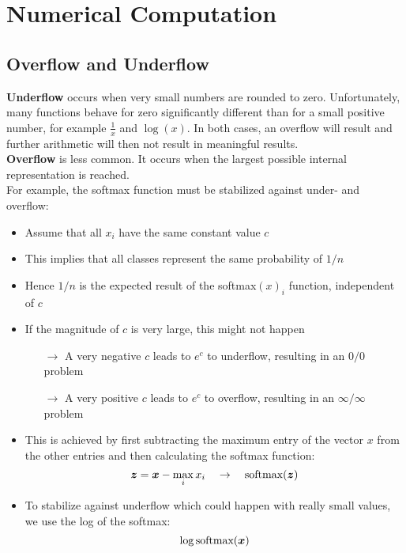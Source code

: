 \section{Numerical Computation}
\begin{multicols}{2}
	\subsection{Overflow and Underflow}
	\textbf{Underflow} occurs when very small numbers are rounded to zero.
	Unfortunately, many functions behave for zero significantly different than for a small positive number, for example $\frac{1}{x}$ and $\log(x)$. In both cases, an overflow will result and further arithmetic will then not result in meaningful results.\\
	
	\textbf{Overflow} is less common. It occurs when the largest possible internal representation is reached.\\
	
	For example, the softmax function must be stabilized against under- and overflow:
	\begin{itemize}
		\item Assume that all $x_i$ have the same constant value $c$
		\item This implies that all classes represent the same probability of $1/n$
		\item Hence $1/n$ is the expected result of the softmax$(x)_i$ function, independent of $c$
		\item If the magnitude of $c$ is very large, this might not happen
		\begin{itemize}
			\item[$\rightarrow$] A very negative $c$ leads to $e^c$ to underflow, resulting in an $0/0$ problem
			\item[$\rightarrow$] A very positive $c$ leads to $e^c$ to overflow, resulting in an $\infty/\infty$ problem
		\end{itemize}
		\item This is achieved by first subtracting the maximum entry of the vector $x$ from the other entries and then calculating the softmax function:
		$$\bol{z}=\bol{x}-\max_ix_i \quad\rightarrow\quad \text{softmax}(\bol{z})$$
		\item To stabilize against underflow which could happen with really small values, we use the log of the softmax:
		\[ \log \text{softmax}(\bol{x}) \]
	\end{itemize}
	

\end{multicols}
